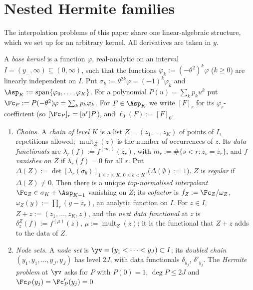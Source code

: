 \section{Nested Hermite families}\label{sec:nested}\label{ssec:hermite}

The interpolation problems of this paper share one linear-algebraic structure, which we set up
for an arbitrary kernel. All derivatives are taken in $y$.

\begin{definition}\label{def:nested}
A \emph{base kernel} is a function $\varphi$, real-analytic on an interval $I=(y_-,\infty)\subseteq(0,\infty)$,
such that the functions $\varphi_k:=(-\theta^2)^k\varphi$ ($k\ge0$) are linearly independent on $I$.
Put $\sigma_k:=\theta^{2k}\varphi=(-1)^k\varphi_k$ and $\Asp_K:=\operatorname{span}\{\varphi_0,\dots,\varphi_K\}$. For a
polynomial $P(u)=\sum_kp_ku^k$ put $\Fc_P:=P(-\theta^2)\varphi=\sum_kp_k\varphi_k$. For $F\in\Asp_K$ we write
$[F]_r$ for its $\varphi_r$-coefficient (so $[\Fc_P]_r=[u^r]P$), and $\ell_0(F):=[F]_0$.
\begin{enumerate}[label=(\roman*),leftmargin=2em]
\item \emph{Chains.} A \emph{chain of level $K$} is a list $Z=(z_1,\dots,z_K)$ of points of $I$, repetitions
allowed; $\operatorname{mult}_Z(z)$ is the number of occurrences of $z$. Its \emph{data functionals} are
$\lambda_r(f):=f^{(m_r)}(z_r)$, with $m_r:=\#\{s<r:z_s=z_r\}$, and $f$ \emph{vanishes on $Z$} if
$\lambda_r(f)=0$ for all $r$. Put $\Delta(Z):=\det[\lambda_r(\sigma_b)]_{1\le r\le K,\,0\le b<K}$ ($\Delta(\emptyset):=1$).
$Z$ is \emph{regular} if $\Delta(Z)\ne0$. Then there is a unique \emph{top-normalised interpolant}
$\Fc_Z\in\sigma_K+\Asp_{K-1}$ vanishing on $Z$; its \emph{cofactor} is $f_Z:=\Fc_Z/\omega_Z$,
$\omega_Z(y):=\prod_{r}(y-z_r)$, an analytic function on $I$. For $z\in I$, $Z+z:=(z_1,\dots,z_K,z)$, and
the \emph{next data functional} at $z$ is $\delta^Z_z(f):=f^{(\mu)}(z)$, $\mu:=\operatorname{mult}_Z(z)$; it is the
functional that $Z+z$ adds to the data of $Z$.
\item \emph{Node sets.} A \emph{node set} is $\yv=(y_1<\dots<y_J)\subset I$; its \emph{doubled chain}
$(y_1,y_1,\dots,y_J,y_J)$ has level $2J$, with data functionals $\delta_{y_j}$, $\delta'_{y_j}$. The
\emph{Hermite problem} at $\yv$ asks for $P$ with $P(0)=1$, $\deg P\le2J$ and $\Fc_P(y_j)=\Fc_P'(y_j)=0$

\end{enumerate}
\end{definition}
